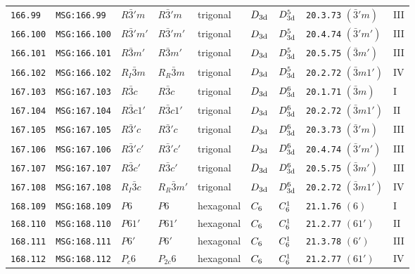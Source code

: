 \documentclass[fleqn,10pt]{jsarticle}
\begin{document}
\begin{center}
\begin{longtable}{lllllllll}
\texttt{166.99} & \texttt{MSG:166.99} & $R\bar{3}'m$ & $R\bar{3}'m$ & trigonal & $D_{\rm 3d}$ & $D_{\rm 3d}^{5}$ & \texttt{20.3.73} $(\bar{3}'m)$ & III \\
\texttt{166.100} & \texttt{MSG:166.100} & $R\bar{3}'m'$ & $R\bar{3}'m'$ & trigonal & $D_{\rm 3d}$ & $D_{\rm 3d}^{5}$ & \texttt{20.4.74} $(\bar{3}'m')$ & III \\
\texttt{166.101} & \texttt{MSG:166.101} & $R\bar{3}m'$ & $R\bar{3}m'$ & trigonal & $D_{\rm 3d}$ & $D_{\rm 3d}^{5}$ & \texttt{20.5.75} $(\bar{3}m')$ & III \\
\texttt{166.102} & \texttt{MSG:166.102} & $R_{I}\bar{3}m$ & $R_{R}\bar{3}m$ & trigonal & $D_{\rm 3d}$ & $D_{\rm 3d}^{5}$ & \texttt{20.2.72} $(\bar{3}m1')$ & IV \\ \hline
\texttt{167.103} & \texttt{MSG:167.103} & $R\bar{3}c$ & $R\bar{3}c$ & trigonal & $D_{\rm 3d}$ & $D_{\rm 3d}^{6}$ & \texttt{20.1.71} $(\bar{3}m)$ & I \\
\texttt{167.104} & \texttt{MSG:167.104} & $R\bar{3}c1'$ & $R\bar{3}c1'$ & trigonal & $D_{\rm 3d}$ & $D_{\rm 3d}^{6}$ & \texttt{20.2.72} $(\bar{3}m1')$ & II \\
\texttt{167.105} & \texttt{MSG:167.105} & $R\bar{3}'c$ & $R\bar{3}'c$ & trigonal & $D_{\rm 3d}$ & $D_{\rm 3d}^{6}$ & \texttt{20.3.73} $(\bar{3}'m)$ & III \\
\texttt{167.106} & \texttt{MSG:167.106} & $R\bar{3}'c'$ & $R\bar{3}'c'$ & trigonal & $D_{\rm 3d}$ & $D_{\rm 3d}^{6}$ & \texttt{20.4.74} $(\bar{3}'m')$ & III \\
\texttt{167.107} & \texttt{MSG:167.107} & $R\bar{3}c'$ & $R\bar{3}c'$ & trigonal & $D_{\rm 3d}$ & $D_{\rm 3d}^{6}$ & \texttt{20.5.75} $(\bar{3}m')$ & III \\
\texttt{167.108} & \texttt{MSG:167.108} & $R_{I}\bar{3}c$ & $R_{R}\bar{3}m'$ & trigonal & $D_{\rm 3d}$ & $D_{\rm 3d}^{6}$ & \texttt{20.2.72} $(\bar{3}m1')$ & IV \\ \hline
\texttt{168.109} & \texttt{MSG:168.109} & $P6$ & $P6$ & hexagonal & $C_{\rm 6}$ & $C_{\rm 6}^{1}$ & \texttt{21.1.76} $(6)$ & I \\
\texttt{168.110} & \texttt{MSG:168.110} & $P61'$ & $P61'$ & hexagonal & $C_{\rm 6}$ & $C_{\rm 6}^{1}$ & \texttt{21.2.77} $(61')$ & II \\
\texttt{168.111} & \texttt{MSG:168.111} & $P6'$ & $P6'$ & hexagonal & $C_{\rm 6}$ & $C_{\rm 6}^{1}$ & \texttt{21.3.78} $(6')$ & III \\
\texttt{168.112} & \texttt{MSG:168.112} & $P_{c}6$ & $P_{2c}6$ & hexagonal & $C_{\rm 6}$ & $C_{\rm 6}^{1}$ & \texttt{21.2.77} $(61')$ & IV \\ \hline

\end{longtable}
\end{center}
\end{document}

